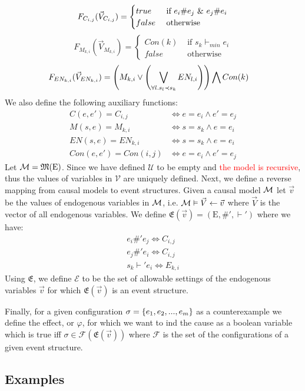 $$
    F_{C_{i,j}}(\vec V_{C_{i,j}}) = \begin{cases}
        true  & \text{ if } e_i \# e_j \ \& \  e_j \# e_i \\
        false & \text{ otherwise }
    \end{cases}
$$
$$
    F_{M_{k,i}}(\vec V_{M_{k,i}}) = \begin{cases}
        Con(k) & \text{ if } s_k \vdash_{min} e_i \\
        false  & \text{ otherwise }
    \end{cases}
$$
\begin{align*}
    F_{EN_{k,i}}(\vec V_{EN_{k,i}}) & =
    \left(
    M_{k,i} \vee
    \left(
    \bigvee_{\forall l. s_l  \prec s_k}EN_{l,i}
    \right)
    \right)
    \bigwedge
    Con(k)
\end{align*}
We also define the following auxiliary functions:
\begin{align*}
    C(e,e') = C_{i,j}    & \iff e = e_i \wedge e' = e_j \\
    M(s,e)  = M_{k,i}    & \iff s = s_k \wedge e = e_i  \\
    EN(s,e)  = EN_{k,i}    & \iff s = s_k \wedge e = e_i  \\
    Con(e,e') = Con(i,j) & \iff e = e_i \wedge e' = e_j
\end{align*}
Let $\mathcal{M} = \mathfrak{M}(\mathrm{E})$.
Since we have defined $\mathcal{U}$ to be empty and 
\textcolor{red}{the model is recursive}, thus the values of variables in
$\mathcal{V}$ are uniquely defined.
Next, we define a reverse mapping from causal models to event structures.
Given a causal model $\mathcal{M}$ let $\vec v$ be the values of endogenous variables
in $\mathcal{M}$, i.e. $\mathcal{M} \vDash \vec V \leftarrow \vec v$ where $\vec V$ is the vector of
all endogenous variables.
We define $\mathfrak{E}(\vec v) = (\mathrm{E},\#',\vdash')$ where we have:
\begin{align*}
    e_i \#' e_j \iff C_{i,j} \\
    e_j \#'e_i \iff C_{i,j} \\
    s_k \vdash' e_i \iff E_{k,i}
\end{align*}
Using $\mathfrak{E}$, we define $\mathcal{E}$ to be the set of allowable
settings of the endogenous variables $\vec v$ for which
$\mathfrak{E}(\vec v)$ is an event structure.

Finally, for a given configuration $\sigma = \{e_1,e_2,...,e_m\}$ as a
counterexample we define the effect, or $\varphi$, for which we want to
ind the cause as a boolean variable which is true iff $\sigma \in \mathcal{F}(\mathfrak{E}(\vec v))$ where $\mathcal{F}$ is the set of the configurations of
a given event structure.
\pagebreak
\subsection{Examples}
